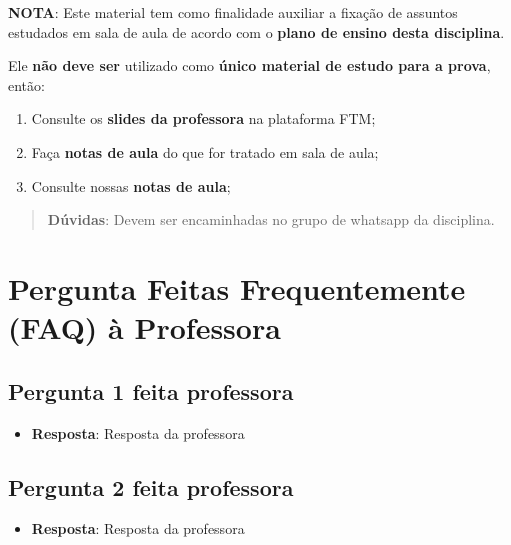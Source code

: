 \documentclass[
]{book}
\providecommand{\tightlist}{%
  \setlength{\itemsep}{0pt}\setlength{\parskip}{0pt}}
\begin{document}
\textbf{NOTA}: Este material tem como finalidade auxiliar a fixação de assuntos estudados em sala de aula de acordo com o \textbf{plano de ensino desta disciplina}.

Ele \textbf{não deve ser} utilizado como \textbf{único material de estudo para a prova}, então:

\begin{enumerate}
\def\labelenumi{\arabic{enumi}.}
\tightlist
\item
  Consulte os \textbf{slides da professora} na plataforma FTM;\\
\item
  Faça \textbf{notas de aula} do que for tratado em sala de aula;\\
\item
  Consulte nossas \textbf{notas de aula};
\end{enumerate}

\begin{quote}
\textbf{Dúvidas}: Devem ser encaminhadas no grupo de whatsapp da disciplina.
\end{quote}

\hypertarget{pergunta-feitas-frequentemente-faq-uxe0-professora}{%
\section{Pergunta Feitas Frequentemente (FAQ) à Professora}\label{pergunta-feitas-frequentemente-faq-uxe0-professora}}

\hypertarget{pergunta-1-feita-professora}{%
\subsection{Pergunta 1 feita professora}\label{pergunta-1-feita-professora}}

\begin{itemize}
\tightlist
\item
  \textbf{Resposta}: Resposta da professora
\end{itemize}

\hypertarget{pergunta-2-feita-professora}{%
\subsection{Pergunta 2 feita professora}\label{pergunta-2-feita-professora}}

\begin{itemize}
\tightlist
\item
  \textbf{Resposta}: Resposta da professora
\end{itemize}
\end{document}
